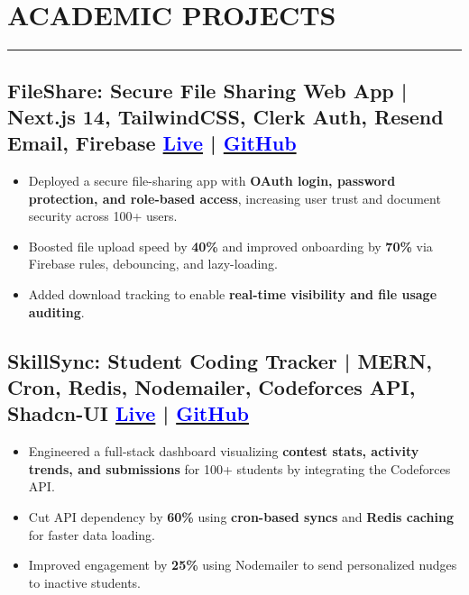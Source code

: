 \documentclass[a4paper]{article}
\newcommand{\sectionlineP}{
   \vspace{-2em} %
    \noindent\rule{\textwidth}{0.4pt}
    \vspace{-2em} %
}
\begin{document}
\section*{ACADEMIC PROJECTS}
\sectionlineP
\vspace{-0.25em}

\subsection*{
  \textbf{FileShare: Secure File Sharing Web App | Next.js 14, TailwindCSS, Clerk Auth, Resend Email, Firebase}
  \hfill 
  \textnormal{
  \href{https://file-share-app-delta.vercel.app/}{\textcolor{blue}{Live}} |
  \href{https://github.com/aakash811/FileShare-App}{\textcolor{blue}{GitHub}}
}}
\vspace{-0.5em}
\begin{itemize}[leftmargin=*]
    \item Deployed a secure file-sharing app with \textbf{OAuth login, password protection, and role-based access}, increasing user trust and document security across 100+ users.
    \vspace{-0.5em}
    \item Boosted file upload speed by \textbf{40\%} and improved onboarding by \textbf{70\%} via Firebase rules, debouncing, and lazy-loading.
    \vspace{-0.5em}
    \item Added download tracking to enable \textbf{real-time visibility and file usage auditing}.
\end{itemize}

\vspace{-1.5em}

\subsection*{
  \textbf{SkillSync: Student Coding Tracker | MERN, Cron, Redis, Nodemailer, Codeforces API, Shadcn-UI}
  \hfill 
  \textnormal{
  \href{https://student-progress-tracker-pi.vercel.app/}{\textcolor{blue}{Live}} |
  \href{https://github.com/aakash811/Student-Progress-Tracker}{\textcolor{blue}{GitHub}}
}}
\vspace{-0.5em}
\begin{itemize}[leftmargin=*]
    \item Engineered a full-stack dashboard visualizing \textbf{contest stats, activity trends, and submissions} for 100+ students by integrating the Codeforces API.
    \vspace{-0.5em}
    \item Cut API dependency by \textbf{60\%} using \textbf{cron-based syncs} and \textbf{Redis caching} for faster data loading.
    \vspace{-0.5em}
    \item Improved engagement by \textbf{25\%} using Nodemailer to send personalized nudges to inactive students.
\end{itemize}
\end{document}
